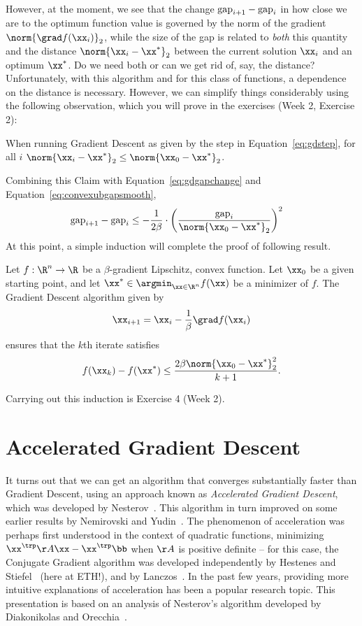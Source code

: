 However, at the moment, we see that the change $\text{gap}_{i+1}- \text{gap}_i$
in how close we are to the optimum function value is governed by the norm of the gradient $\norm{\grad
  f(\xx_{i})}_2$, while the size of the gap is related to \emph{both}
this quantity and the distance $\norm{\xx_i - \xx^*}_2$ between the
current solution $\xx_i$ and an optimum $\xx^*$.
Do we need both or can we get rid of, say, the distance?
Unfortunately, with this algorithm and for this class of functions, a
dependence on the distance is necessary.
However, we can simplify things considerably using the following
observation, which you will prove in the exercises (Week 2, Exercise 2):
\begin{claim}
  \label{clm:gdoptdist}
  When running Gradient Descent as given by the step in
  Equation~\eqref{eq:gdstep},  for all $i$
  $\norm{\xx_i - \xx^*}_2 \leq \norm{\xx_0 - \xx^*}_2$.
\end{claim}
Combining this Claim with Equation~\eqref{eq:gdgapchange} and Equation~\eqref{eq:convexubgapsmooth},
\begin{align}
\label{eq:convexgapsmooth}
  \gap_{i+1}- \gap_i
  &\leq
    -
    \frac{1}{2\beta}
    \cdot
    \left(
    \frac{\gap_i}{\norm{\xx_0 - \xx^*}_2 }
    \right)^2
\end{align}
At this point, a simple induction will complete the proof of following result.
\begin{theorem}
  \label{thm:gdsmoothconv}
  Let $f : \R^n \to \R$ be a $\beta$-gradient Lipschitz, convex
  function.
  Let $\xx_0$ be a given starting point,
  and let $\xx^* \in \argmin_{\xx \in \R^n} f(\xx)$ be a minimizer of $f$.
 The Gradient Descent algorithm given by
  \[
   \xx_{i+1} = \xx_{i} - \frac{1}{\beta} \grad f(\xx_{i})
 \]
 ensures that the $k$th iterate satisfies
 \[
   f(\xx_{k}) - f(\xx^*)\leq \frac{2\beta \norm{\xx_0 - \xx^*}_2^2}{k+1}
   .
   \]
\end{theorem}
Carrying out this induction is Exercise 4 (Week 2).

\section{Accelerated Gradient Descent}


It turns out that we can get an algorithm that converges substantially
faster than Gradient Descent, using an approach known as
\emph{Accelerated Gradient Descent}, which was developed by
Nesterov~\cite{n83}.
This algorithm in turn improved on some earlier results by Nemirovski and Yudin~\cite{ny83}.
The phenomenon of acceleration was perhaps first understood in the context of
quadratic functions, minimizing $\xx^\trp \AA \xx - \xx^\trp \bb$
when $\AA$ is positive definite -- for this case, the Conjugate
Gradient algorithm was developed independently by Hestenes and
Stiefel~\cite{hs52} (here at ETH!), and by Lanczos~\cite{l52}.
In the past few years, providing more intuitive explanations of
acceleration has been a popular research topic.
This presentation is based on an analysis of Nesterov's algorithm
developed by Diakonikolas and Orecchia~\cite{do19}.

